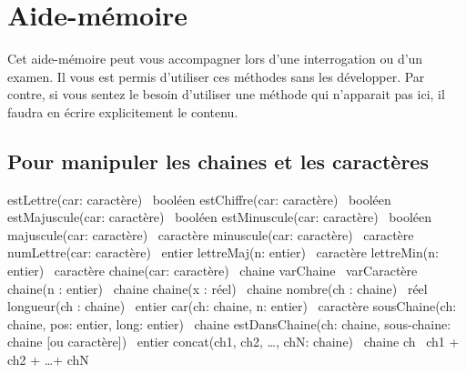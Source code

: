 \chapter{Aide-mémoire}

Cet aide-mémoire peut vous accompagner lors d'une
interrogation ou d'un examen. 
Il vous est permis d’utiliser ces méthodes sans les développer.
Par contre, si vous sentez le besoin d’utiliser 
une méthode qui n'apparait pas ici, 
il faudra en écrire explicitement le contenu.

\section{Pour manipuler les chaines et les caractères}

\begin{Pseudocode}
	\Empty
	\Stmt estLettre(car: caractère) \Gives~booléen		
	\Stmt estChiffre(car: caractère) \Gives~booléen		
	\Stmt estMajuscule(car: caractère) \Gives~booléen	
	\Stmt estMinuscule(car: caractère) \Gives~booléen	
	\Empty
	\Empty
	\Stmt majuscule(car: caractère) \Gives~caractère	
	\Stmt minuscule(car: caractère) \Gives~caractère	
	\Stmt numLettre(car: caractère) \Gives~entier		
	\Stmt lettreMaj(n: entier) \Gives~caractère			
	\Stmt lettreMin(n: entier) \Gives~caractère			
	\Stmt chaine(car: caractère) \Gives~chaine			
	\Let varChaine \Gets~varCaractère					
	\Stmt chaine(n : entier) \Gives~chaine				
	\Stmt chaine(x : réel) \Gives~chaine				
	\Stmt nombre(ch : chaine) \Gives~réel				
	\Empty
	\Empty
	\Stmt longueur(ch : chaine) \Gives~entier			
	\Stmt car(ch: chaine, n: entier) \Gives~caractère	
	\Stmt sousChaine(ch: chaine, pos: entier, long: entier) \Gives~chaine 
	\Stmt estDansChaine(ch: chaine, sous-chaine: chaine [ou caractère]) \Gives~entier 
	\Stmt 	{}
	\Stmt concat(ch1, ch2, \dots, chN: chaine) \Gives~chaine 	
	\Let  ch \Gets~ch1 + ch2 + \dots + chN						
\end{Pseudocode}
